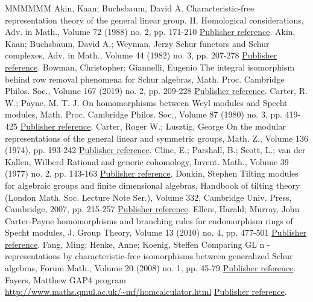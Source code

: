 \begin{thebibliography}{MMMMMM}
 Akin, Kaan; Buchsbaum, David A. Characteristic-free representation theory of the general linear group. II. Homological considerations, Adv. in Math., Volume 72 (1988) no. 2, pp. 171-210 \href{https://alco.centre-mersenne.org/articles/10.5802/alco.397/#AB}{Publisher reference}.
 Akin, Kaan; Buchsbaum, David A.; Weyman, Jerzy Schur functors and Schur complexes, Adv. in Math., Volume 44 (1982) no. 3, pp. 207-278 \href{https://alco.centre-mersenne.org/articles/10.5802/alco.397/#ABW}{Publisher reference}.
 Bowman, Christopher; Giannelli, Eugenio The integral isomorphism behind row removal phenomena for Schur algebras, Math. Proc. Cambridge Philos. Soc., Volume 167 (2019) no. 2, pp. 209-228 \href{https://alco.centre-mersenne.org/articles/10.5802/alco.397/#BG}{Publisher reference}.
 Carter, R. W.; Payne, M. T. J. On homomorphisms between Weyl modules and Specht modules, Math. Proc. Cambridge Philos. Soc., Volume 87 (1980) no. 3, pp. 419-425 \href{https://alco.centre-mersenne.org/articles/10.5802/alco.397/#CP}{Publisher reference}.
 Carter, Roger W.; Lusztig, George On the modular representations of the general linear and symmetric groups, Math. Z., Volume 136 (1974), pp. 193-242 \href{https://alco.centre-mersenne.org/articles/10.5802/alco.397/#CL}{Publisher reference}.
 Cline, E.; Parshall, B.; Scott, L.; van der Kallen, Wilberd Rational and generic cohomology, Invent. Math., Volume 39 (1977) no. 2, pp. 143-163 \href{https://alco.centre-mersenne.org/articles/10.5802/alco.397/#CPSK}{Publisher reference}.
 Donkin, Stephen Tilting modules for algebraic groups and finite dimensional algebras, Handbook of tilting theory (London Math. Soc. Lecture Note Ser.), Volume 332, Cambridge Univ. Press, Cambridge, 2007, pp. 215-257 \href{https://alco.centre-mersenne.org/articles/10.5802/alco.397/#D}{Publisher reference}.
 Ellers, Harald; Murray, John Carter-Payne homomorphisms and branching rules for endomorphism rings of Specht modules, J. Group Theory, Volume 13 (2010) no. 4, pp. 477-501 \href{https://alco.centre-mersenne.org/articles/10.5802/alco.397/#EM}{Publisher reference}.
 Fang, Ming; Henke, Anne; Koenig, Steffen Comparing  GL  n -representations by characteristic-free isomorphisms between generalized Schur algebras, Forum Math., Volume 20 (2008) no. 1, pp. 45-79 \href{https://alco.centre-mersenne.org/articles/10.5802/alco.397/#FHKD}{Publisher reference}.
 Fayers, Matthew GAP4 program \url{http://www.maths.qmul.ac.uk/~mf/homcalculator.html} \href{https://alco.centre-mersenne.org/articles/10.5802/alco.397/#FGAP}{Publisher reference}.

\end{thebibliography}
